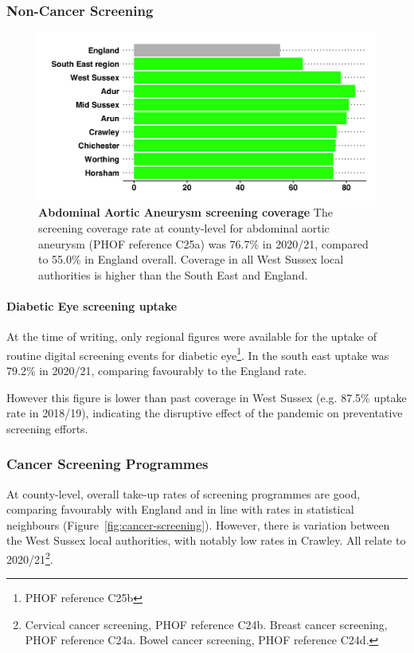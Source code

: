 \subsubsection{Non-Cancer Screening}
\begin{figure}[ht]
    \caption[Abdominal Aortic Aneurysm screening coverage]{{\bf Abdominal Aortic Aneurysm screening coverage} The screening coverage rate at county-level for abdominal aortic aneurysm (PHOF reference C25a) was 76.7\% in 2020/21, compared to 55.0\% in England overall. Coverage in all West Sussex local authorities is higher than the South East and England.}
    \label{figure:aaa:screening}
    \centering
    \includegraphics[width=\linewidth]{images/aaa_rag_bar.png}
\end{figure}

\paragraph{Diabetic Eye screening uptake}At the time of writing, only regional figures were available for the uptake of routine digital screening events for diabetic eye\footnote{PHOF reference C25b}. In the south east uptake was 79.2\% in 2020/21, comparing favourably to the England rate.

However this figure is lower than past coverage in West Sussex (e.g. 87.5\% uptake rate in 2018/19), indicating the disruptive effect of the pandemic on preventative screening efforts.



\subsubsection{Cancer Screening Programmes}
At county-level, overall take-up rates of screening programmes are good, comparing favourably with England and in line with rates in statistical neighbours (Figure~\ref{fig:cancer-screening}). However, there is variation between the West Sussex local authorities, with notably low rates in Crawley. All relate to 2020/21\footnote{Cervical cancer screening, PHOF reference C24b. Breast cancer screening, PHOF reference C24a. Bowel cancer screening, PHOF reference C24d.}.

